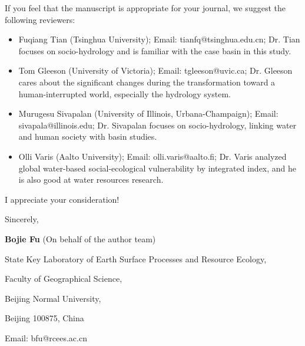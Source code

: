 \documentclass[11pt,a4paper,roman]{moderncv}
\begin{document}
If you feel that the manuscript is appropriate for your journal, we suggest the following reviewers:

\begin{itemize}
\item Fuqiang Tian (Tsinghua University); Email: tianfq@tsinghua.edu.cn; Dr. Tian focuses on socio-hydrology and is familiar with the case basin in this study.
\item Tom Gleeson (University of Victoria); Email: tgleeson@uvic.ca; Dr. Gleeson cares about the significant changes during the transformation toward a human-interrupted world, especially the hydrology system.
\item Murugesu Sivapalan (University of Illinois, Urbana-Champaign); Email: sivapala@illinois.edu; Dr. Sivapalan focuses on socio-hydrology, linking water and human society with basin studies.
\item Olli Varis (Aalto University); Email: olli.varis@aalto.fi; Dr. Varis analyzed global water-based social-ecological vulnerability by integrated index, and he is also good at water resources research.
\end{itemize}

\vspace{0.3cm}

I appreciate your consideration!

\vspace{0.3cm}

Sincerely,

\textbf{Bojie Fu} (On behalf of the author team)


State Key Laboratory of Earth Surface Processes and Resource Ecology,

Faculty of Geographical Science,

Beijing Normal University,

Beijing 100875, China

Email: bfu@rcees.ac.cn
\end{document}
